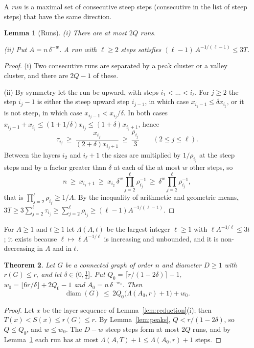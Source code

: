 \documentclass[11pt]{amsart}
\newtheorem{theorem}{Theorem}[section]
\newtheorem{lemma}[theorem]{Lemma}
\theoremstyle{definition}
\theoremstyle{remark}
\newcommand{\diam}{\operatorname{diam}}
\begin{document}
A \emph{run} is a maximal set of consecutive steep steps (consecutive in the list of steep steps) that have the same direction.

\begin{lemma}[Runs]\label{lem:runs}
{\rm(i)} There are at most $2Q$ runs.

{\rm(ii)} Put $A=n\,\delta^{-w}$. A run with $\ell\ge2$ steps satisfies $(\ell-1)\,A^{-1/(\ell-1)}\le3T$.
\end{lemma}

\begin{proof}
(i) Two consecutive runs are separated by a peak cluster or a valley cluster, and there are $2Q-1$ of these.

(ii) By symmetry let the run be upward, with steps $i_1<\dots<i_\ell$.
For $j\ge2$ the step $i_j-1$ is either the steep upward step $i_{j-1}$, in which case $x_{i_j-1}\le\delta x_{i_j}$, or it is not steep, in which case $x_{i_j-1}<x_{i_j}/\delta$.
In both cases $x_{i_j-1}+x_{i_j}\le(1+1/\delta)x_{i_j}\le(1+\delta)x_{i_j+1}$, hence
\[
\tau_{i_j}\ \ge\ \frac{x_{i_j}}{(2+\delta)x_{i_j+1}}\ \ge\ \frac{\rho_{i_j}}3\qquad(2\le j\le\ell).
\]
Between the layers $i_2$ and $i_\ell+1$ the sizes are multiplied by $1/\rho_{i_j}$ at the steep steps and by a factor greater than $\delta$ at each of the at most $w$ other steps, so
\[
n\ \ge\ x_{i_\ell+1}\ \ge\ x_{i_2}\,\delta^{w}\prod_{j=2}^{\ell}\rho_{i_j}^{-1}\ \ge\ \delta^{w}\prod_{j=2}^{\ell}\rho_{i_j}^{-1},
\]
that is $\prod_{j=2}^\ell\rho_{i_j}\ge1/A$. By the inequality of arithmetic and geometric means,
$3T\ge3\sum_{j=2}^{\ell}\tau_{i_j}\ge\sum_{j=2}^\ell\rho_{i_j}\ge(\ell-1)A^{-1/(\ell-1)}$.
\end{proof}

For $A\ge1$ and $t\ge1$ let $\Lambda(A,t)$ be the largest integer $\ell\ge1$ with $\ell A^{-1/\ell}\le3t$; it exists because $\ell\mapsto\ell A^{-1/\ell}$ is increasing and unbounded, and it is non-decreasing in $A$ and in $t$.

\begin{theorem}\label{thm:upper}
Let $G$ be a connected graph of order $n$ and diameter $D\ge1$ with $r(G)\le r$, and let $\delta\in(0,\frac14]$.
Put $Q_0=\lceil r/(1-2\delta)\rceil-1$, $w_0=\lfloor6r/\delta\rfloor+2Q_0-1$ and $A_0=n\,\delta^{-w_0}$. Then
\[
\diam(G)\ \le\ 2Q_0\bigl(\Lambda(A_0,r)+1\bigr)+w_0 .
\]
\end{theorem}

\begin{proof}
Let $x$ be the layer sequence of Lemma~\ref{lem:reduction}(i); then $T(x)<S(x)\le r(G)\le r$.
By Lemma~\ref{lem:peaks}, $Q<r/(1-2\delta)$, so $Q\le Q_0$, and $w\le w_0$.
The $D-w$ steep steps form at most $2Q$ runs, and by Lemma~\ref{lem:runs} each run has at most $\Lambda(A,T)+1\le\Lambda(A_0,r)+1$ steps.
\end{proof}
\end{document}
